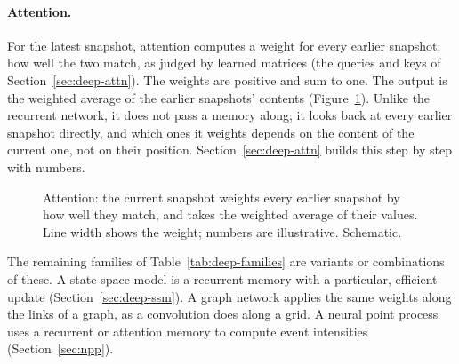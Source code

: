 \paragraph{Attention.} For the latest snapshot, attention computes a weight for every earlier snapshot: how well the
two match, as judged by learned matrices (the queries and keys of Section~\ref{sec:deep-attn}). The weights are
positive and sum to one. The output is the weighted average of the earlier snapshots' contents (Figure~\ref{fig:fam-attn}).
Unlike the recurrent network, it does not pass a memory along; it looks back at every earlier snapshot directly, and
which ones it weights depends on the content of the current one, not on their position.
Section~\ref{sec:deep-attn} builds this step by step with numbers.

\begin{figure}[!htbp]
\centering
{}
\caption{Attention: the current snapshot weights every earlier snapshot by how well they match, and takes the
weighted average of their values. Line width shows the weight; numbers are illustrative. Schematic.}
\label{fig:fam-attn}
\end{figure}

The remaining families of Table~\ref{tab:deep-families} are variants or combinations of these. A state-space model
is a recurrent memory with a particular, efficient update (Section~\ref{sec:deep-ssm}). A graph network applies the
same weights along the links of a graph, as a convolution does along a grid. A neural point process uses a
recurrent or attention memory to compute event intensities (Section~\ref{sec:npp}).


